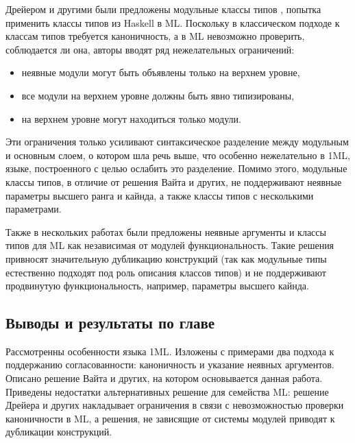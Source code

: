 \documentclass[../diploma.tex]{subfiles}
\begin{document}
Дрейером и другими были предложены модульные классы типов \cite{ml_typeclasses}, попытка применить классы типов из Haskell в ML. Поскольку в классическом подходе к классам типов требуется каноничность, а в ML невозможно проверить, соблюдается ли она, авторы вводят ряд нежелательных ограничений:

\begin{itemize}
	\item неявные модули могут быть объявлены только на верхнем уровне,
	\item все модули на верхнем уровне должны быть явно типизированы,
	\item на верхнем уровне могут находиться только модули.
\end{itemize}

Эти ограничения только усиливают синтаксическое разделение между модульным и основным слоем, о котором шла речь выше, что особенно нежелательно в 1ML, языке, построенного с целью ослабить это разделение. Помимо этого, модульные классы типов, в отличие от решения Вайта и других, не поддерживают неявные параметры высшего ранга и кайнда, а также классы типов с несколькими параметрами.

Также в нескольких работах были предложены неявные аргументы \cite{experiments} и классы типов \cite{schneider} для ML как независимая от модулей функциональность. Такие решения привносят значительную дубликацию конструкций (так как модульные типы естественно подходят под роль описания классов типов) и не поддерживают продвинутую функциональность, например, параметры высшего кайнда.

\subsection{Выводы и результаты по главе}

Рассмотренны особенности языка 1ML. Изложены с примерами два подхода к поддержанию согласованности: каноничность и указание неявных аргументов. Описано решение Вайта и других, на котором основывается данная работа. Приведены недостатки альтернативных решение для семейства ML: решение Дрейера и других накладывает ограничения в связи с невозможностью проверки каноничности в ML, а решения, не зависящие от системы модулей приводят к дубликации конструкций.
\end{document}
